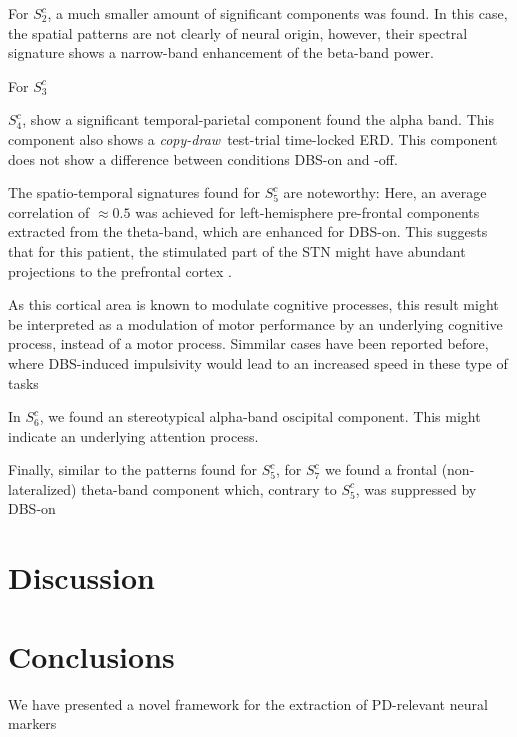 \documentclass[10pt,a4paper, twocolumn]{article}
\newcommand{\cpdt}[0]{\textit{copy-draw}~test\xspace}
\newcommand{\patient}[2]{$S_{#1}^{#2}$}
\begin{document}
For \patient{2}{c}, a much smaller amount of significant components was found. In this case, the spatial patterns are not clearly of neural origin, however, their spectral signature shows a narrow-band enhancement of the beta-band power.

For \patient{3}{c} 

\patient{4}{c}, show a significant temporal-parietal component found the alpha band. This component also shows a \cpdt-trial time-locked ERD. This component does not show a difference between conditions DBS-on and -off.

The spatio-temporal signatures found for \patient{5}{c} are noteworthy: Here, an average correlation of $\approx0.5$ was achieved for left-hemisphere pre-frontal components extracted from the theta-band, which are enhanced for DBS-on. This suggests that for this patient, the stimulated part of the STN might have abundant projections to the prefrontal cortex .

As this cortical area is known to modulate cognitive processes, this result might be interpreted as a modulation of motor performance by an underlying cognitive process, instead of a motor process. Simmilar cases have been reported before, where DBS-induced impulsivity would lead to an increased speed in these type of tasks \cite{IMPULSIVITY DBS}

In \patient{6}{c}, we found an stereotypical alpha-band oscipital component. This might indicate an underlying attention process. 

Finally, similar to the patterns found for \patient{5}{c}, for \patient{7}{c} we found a frontal (non-lateralized) theta-band component which, contrary to \patient{5}{c}, was suppressed by DBS-on


\section{Discussion}






\section{Conclusions}
We have presented a novel framework for the extraction of PD-relevant neural markers




\end{document}
